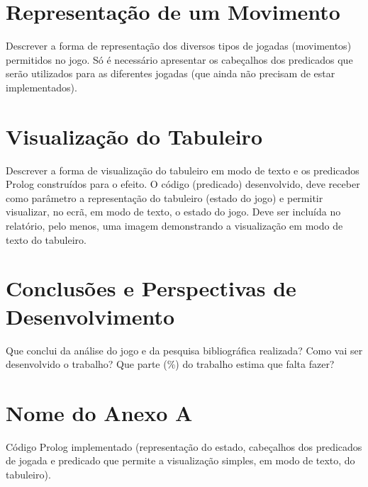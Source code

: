 \documentclass[15pt,a4paper]{article}
\begin{document}
\section{Representação de um Movimento}
Descrever a forma de representação dos diversos tipos de jogadas (movimentos) permitidos no jogo. Só é necessário apresentar os cabeçalhos dos predicados que serão utilizados para as diferentes jogadas (que ainda não precisam de estar implementados).

\section{Visualização do Tabuleiro}
Descrever a forma de visualização do tabuleiro em modo de texto e os predicados Prolog construídos para o efeito. O código (predicado) desenvolvido, deve receber como parâmetro a representação do tabuleiro (estado do jogo) e permitir visualizar, no ecrã, em modo de texto, o estado do jogo. Deve ser incluída no relatório, pelo menos, uma imagem demonstrando a visualização em modo de texto do tabuleiro.

\section{Conclusões e Perspectivas de Desenvolvimento}
Que conclui da análise do jogo e da pesquisa bibliográfica realizada? Como vai ser desenvolvido o trabalho? Que parte (\%) do trabalho estima que falta fazer?

\clearpage
{}
\renewcommand\refname{Bibliografia}



\newpage
\appendix
\section{Nome do Anexo A}
Código Prolog implementado (representação do estado, cabeçalhos dos predicados de jogada e predicado que permite a visualização simples, em modo de texto, do tabuleiro).
\end{document}
